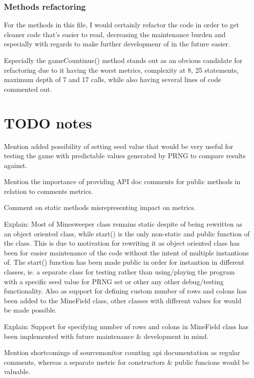 \documentclass[UKenglish]{article}  %
\begin{document}
\subsubsection{Methods refactoring}
For the methods in this file, I would certainly refactor the code in order
to get cleaner code that's easier to read, decreasing the maintenance burden
and especially with regards to make further developmenr of in the future
easier.

Especially the gameCountinue() method stands out as an obvious candidate for
refactoring due to it having the worst metrics,
complexity at 8, 25 statements, maximum depth of 7 and 17 calls, while also
having several lines of code commented out.
																																															

\section{TODO notes}
Mention added possibility of setting seed value that would be very useful for
testing the game with predictable values generated by PRNG to compare results
against.


Mention the importance of providing API doc comments for public methods in
relation to comments metrics.


Comment on static methods misrepresenting impact on metrics.

Explain: Most of Minesweeper class remains static despite of being rewritten
as an object oriented class, while start() is the only non-static and public
function of the class. This is due to motivation for rewriting it as object
oriented class has been for easier maintenance of the code without the intent
of multiple instantions of. The start() function has been made public in order
for instantion in different classes, ie. a separate class for testing rather
than using/playing the program with a specific seed value for PRNG set or
other any other debug/testing functionality.
Also as support for defining custom number of rows and colons has been added
to the MineField class, other classes with different values for would be
made possible.

Explain: Support for specifying number of rows and colons in MineField class
has been implemented with future maintenance \& development in mind.

Mention shortcomings of sourcemonitor counting api documentation as regular
comments, whereas a separate metric for constructors \& public funcions would
be valuable.
\end{document}
